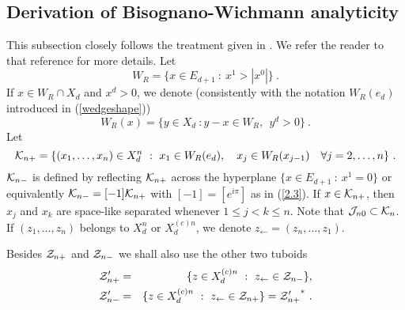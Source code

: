 \documentclass[a4paper,a4paper]{article}
\def\JJ{{\cal J}}
\def\KK{{\cal K}}
\def\ZZ{{\cal Z}}
\def\Xdn{X_d^n}
\def\Xcdn{X_d^{(c)n}}
\def\amb{E_{d+1}}
\begin{document}
\subsection{Derivation of Bisognano-Wichmann analyticity}

\label{DBW}


This subsection closely follows the treatment given in \cite{BEM}.
We refer the reader to that reference for more details.
Let
\begin{equation}
W_R = \{x \in \amb\ :\ x^1 > |x^0|\}\ .
\label{5.6}\end{equation}
If $x \in W_R \cap X_d$ and $x^d >0$, we denote
(consistently with the notation $W_R(e_d)$ introduced in
(\ref{wedgeshape}))
\begin{equation}
W_R(x) = \{y \in X_d\ : y-x \in W_R,\ \ y^d >0\}\ .
\label{5.7}\end{equation}
Let
\begin{equation}
\KK_{n+} = \{(x_1,\ldots,x_n)\in \Xdn\ :\ x_1 \in W_R(e_d),\ \ \
x_j \in W_R(x_{j-1})\ \ \ \forall j = 2,\ldots,n\}\ .
\label{5.8}\end{equation}
$\KK_{n-}$ is defined by reflecting $\KK_{n+}$ across the
hyperplane $\{x \in \amb\ :\ x^1 = 0\}$ or equivalently
$\KK_{n-} = [-1]\KK_{n+}$ with $[-1] = [e^{i\pi}]$ as in (\ref{2.3}).
If $x \in \KK_{n+}$, then $x_j$ and $x_k$ are space-like separated
whenever $1 \le j < k \le n$.
Note that $\JJ_{n0} \subset \KK_n$.
If $(z_1,\ldots,z_n)$ belongs to $\Xdn$ or $\Xcdn$,
we denote $z_\leftarrow = (z_n,\ldots,z_1)$.

Besides $\ZZ_{n+}$ and $\ZZ_{n-}$ we shall also use the
other two tuboids
\begin{eqnarray}
\ZZ'_{n+} &=& \{z \in \Xcdn\ :\
z_\leftarrow \in \ZZ_{n-}\},\nonumber\\
\ZZ'_{n-} &=& \{z \in \Xcdn\ :\
z_\leftarrow \in \ZZ_{n+}\} = {\ZZ'_{n+}}^*\ .
\label{5.10}\end{eqnarray}
\end{document}
